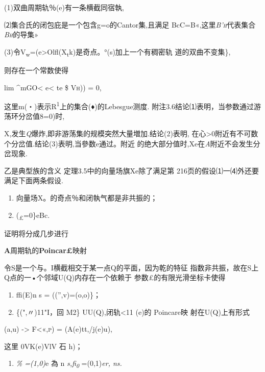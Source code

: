 \documentclass{article}
\begin{document}
(1)双曲周期轨％(e)有一条横截同宿執,

⑵集合氏的闭包庇是一个包含g=o的Cantor集,且满足
BcC=B«,这里\emph{\textsc{B'h}}代表集合\emph{\textsc{Bh}}的导集»

(3)令V\textsubscript{w}=(e\textgreater{}Olfl(X\textsubscript{t}k)是奇点。°(s)加上一个有稠密轨
道的双曲不变集\},

则存在一个常数使得

lim \^{}mGO\textless{} e\textless{} t\textbar{}e \$ \textsc{Vh))} = 0,

这里m(・)表示R\textsuperscript{1}上的集合(♦)的Lebesgue测度.
附注3.6结论⑴表明，当参数通过游荡环分岔值8=0)时,

X,发生\emph{Q}爆炸,即非游荡集的规模突然大量増加.结论(2)表明,
在心\textgreater{}0附近有不可数个分岔值.结论(3)表明,当參数e通过。附近
的绝大部分值时,Xe在\emph{A}附近不会发生分岔现象.

乙是典型族的含义 定理3.5中的向量场旗Xe除了满足第
216页的假设⑴一⑷外还要满足下面两条假设.

\begin{enumerate}
\def\labelenumi{(\arabic{enumi})}
\setcounter{enumi}{4}
\item
  向量场X。的奇点％和闭執气都是非共振的；
\item
  (\textsubscript{£}=0\}eBc.
\end{enumerate}

证明将分成几步进行

\textbf{A}周期轨的\textbf{Poincar£}映射

令S是一个与。I横截相交于某一点Q的平面，因为乾的特征
指数非共振，故在S上Q点的一•个邻域U(Q)内存在一个依赖于
参数£的有限光滑坐标卡使得

\begin{enumerate}
\def\labelenumi{(\arabic{enumi})}
\item
  ffi(E)n s = (('',v)=(o,o)\}；
\item
  \{(",〃)11"I，回 M2\} UU(Q),闭轨\textless{}11 (e)的 Poincare映
  射在U(Q)上有形式
\end{enumerate}

(a,u) -\textgreater{} \textsc{F\textless{}«,p)} = (A(e)tt,/j(e)u),

这里 0VK(e)VlV 石 h)；

\begin{enumerate}
\def\labelenumi{(\arabic{enumi})}
\setcounter{enumi}{2}
\item
  \emph{\% =(1,0)}e 為 n \emph{s,fi\textsubscript{0}} =(0,1)\emph{er,
  ns.}
\end{enumerate}
\end{document}
